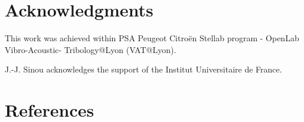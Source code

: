 \documentclass[final,1p]{elsarticle}
\begin{document}
\section*{Acknowledgments}

This work was achieved within PSA Peugeot Citro\"{e}n Stellab program - OpenLab Vibro-Acoustic-
Tribology@Lyon (VAT@Lyon).

J.-J. Sinou acknowledges the support of the Institut Universitaire de France.

\section*{References}

%
%

%

\end{document}
